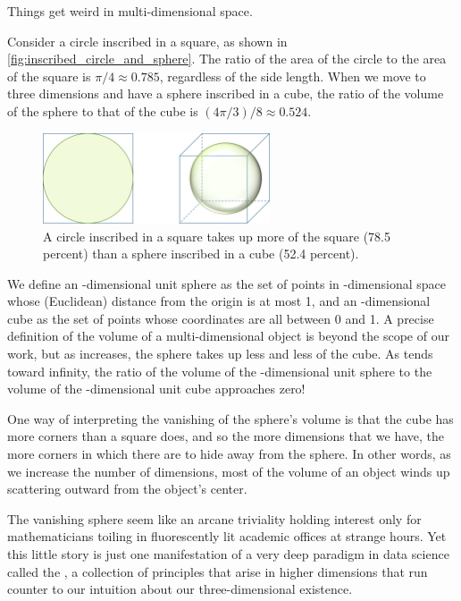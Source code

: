 Things get weird in multi-dimensional space.

Consider a circle inscribed in a square, as shown in \autoref{fig:inscribed_circle_and_sphere}. The ratio of the area of the circle to the area of the square is $π/4 \approx 0.785$, regardless of the side length. When we move to three dimensions and have a sphere inscribed in a cube, the ratio of the volume of the sphere to that of the cube is $(4π/3)/8 \approx 0.524$.\\

\begin{figure}[h]
\centering
\mySfFamily
\includegraphics[width = 0.6\textwidth]{../images/inscribed_circle_and_sphere.png}
\caption{A circle inscribed in a square takes up more of the square (78.5 percent) than a sphere inscribed in a cube (52.4 percent).}
\label{fig:inscribed_circle_and_sphere}
\end{figure}

We define an -dimensional unit sphere as the set of points in -dimensional space whose (Euclidean) distance from the origin is at most 1, and an -dimensional cube as the set of points whose coordinates are all between 0 and 1. A precise definition of the volume of a multi-dimensional object is beyond the scope of our work, but as  increases, the sphere takes up less and less of the cube. As  tends toward infinity, the ratio of the volume of the -dimensional unit sphere to the volume of the -dimensional unit cube approaches zero!

One way of interpreting the vanishing of the sphere's volume is that the cube has more corners than a square does, and so the more dimensions that we have, the more corners in which there are to hide away from the sphere. In other words, as we increase the number of dimensions, most of the volume of an object winds up scattering outward from the object's center.

The vanishing sphere seem like an arcane triviality holding interest only for mathematicians toiling in fluorescently lit academic offices at strange hours. Yet this little story is just one manifestation of a very deep paradigm in data science called the , a collection of principles that arise in higher dimensions that run counter to our intuition about our three-dimensional existence.

